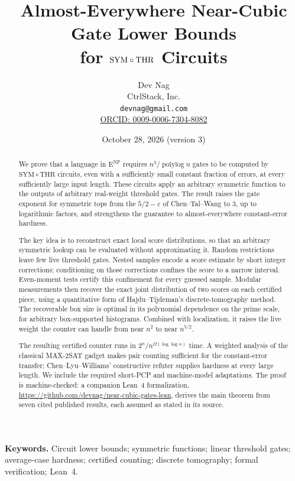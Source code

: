 \documentclass[11pt,letterpaper]{article}
\title{Almost-Everywhere Near-Cubic Gate Lower Bounds\\
for \texorpdfstring{$\SYM\circ\THR$}{SYM-THR} Circuits}
\author{Dev Nag\\CtrlStack, Inc.\\\texttt{devnag@gmail.com}\\
\href{https://orcid.org/0009-0006-7304-8082}{ORCID: 0009-0006-7304-8082}}
\date{October 28, 2026 (version 3)}
\theoremstyle{definition}
\theoremstyle{remark}
\newcommand{\THR}{\mathrm{THR}}
\newcommand{\SYM}{\mathrm{SYM}}
\newcommand{\ENP}{\mathrm{E}^{\mathrm{NP}}}
\begin{document}
\maketitle
\begin{abstract}
We prove that a language in \(\ENP\) requires
\(n^3/\operatorname{polylog}n\) gates to be computed by
\(\SYM\circ\THR\) circuits, even with a sufficiently small constant
fraction of errors, at every sufficiently large input length.
These circuits apply an arbitrary symmetric function to the outputs
of arbitrary real-weight threshold gates. The result raises the gate
exponent for symmetric tops from the \(5/2-\varepsilon\) of
Chen--Tal--Wang to \(3\), up to logarithmic factors, and strengthens
the guarantee to almost-everywhere constant-error hardness.

The key idea is to reconstruct exact local score distributions, so
that an arbitrary symmetric lookup can be evaluated without
approximating it. Random restrictions leave few live threshold gates.
Nested samples encode a score estimate by short integer corrections;
conditioning on those corrections confines the score to a narrow
interval. Even-moment tests certify this confinement for every guessed
sample. Modular measurements then recover the exact joint distribution
of two scores on each certified piece, using a quantitative form of
Hajdu--Tijdeman's discrete-tomography method. The recoverable box size
is optimal in its polynomial dependence on the prime scale, for
arbitrary box-supported histograms. Combined with localization, it
raises the live weight the counter can handle from near \(n^2\) to near
\(n^{5/2}\).

The resulting certified counter runs in
\(2^n/n^{\Omega(\log\log n)}\) time. A weighted analysis of the
classical MAX-2SAT gadget makes pair counting sufficient for the
constant-error transfer; Chen--Lyu--Williams' constructive refuter
supplies hardness at every large length. We include the required
short-PCP and machine-model adaptations. The proof is machine-checked:
a companion Lean~4 formalization,
\url{https://github.com/devnag/near-cubic-gates-lean}, derives the main
theorem from seven cited published results, each assumed as stated in
its source.
\end{abstract}

\medskip
\noindent\textbf{Keywords.} Circuit lower bounds; symmetric functions;
linear threshold gates; average-case hardness; certified counting;
discrete tomography; formal verification; Lean~4.

\clearpage
\tableofcontents
\clearpage
\end{document}
